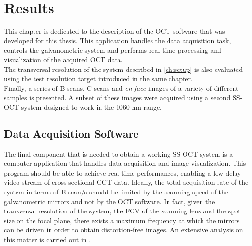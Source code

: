 
\chapter{Results} %
\label{ch:results} %

This chapter is dedicated to the description of the OCT software that was developed for this thesis. This application handles the data acquisition task, controls the galvanometric system and performs real-time processing and visualization of the acquired OCT data. \\

\noindent The transversal resolution of the system described in \autoref{ch:setup} is also evaluated using the test resolution target introduced in the same chapter. \\

\noindent Finally, a series of B-scans, C-scans and \emph{en-face} images of a variety of different samples is presented. A subset of these images were acquired using a second SS-OCT system designed to work in the 1060 nm range. 



\section{Data Acquisition Software}

The final component that is needed to obtain a working SS-OCT system is a computer application that handles data acquisition and image visualization. This program should be able to achieve real-time performances, enabling a low-delay video stream of cross-sectional OCT data. Ideally, the total acquisition rate of the system in terms of B-scan/s should be limited by the scanning speed of the galvanometric mirrors and not by the OCT software. In fact, given the transversal resolution of the system, the FOV of the scanning lens and the spot size on the focal plane, there exists a maximum frequency at which the mirrors can be driven in order to obtain distortion-free images. An extensive analysis on this matter is carried out in \cite{Calabrese2017}. \\



